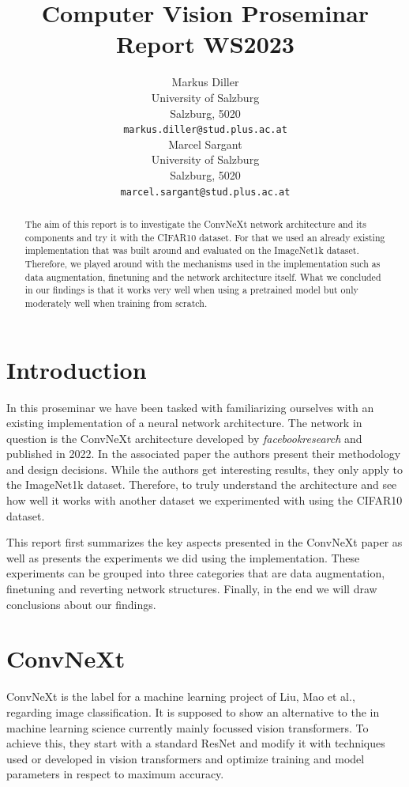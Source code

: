\documentclass{article}
\title{Computer Vision Proseminar Report WS2023}
\author{%
    Markus Diller\\
    University of Salzburg\\
    Salzburg, 5020 \\
    \texttt{markus.diller@stud.plus.ac.at} \\
    \And
    Marcel Sargant \\
    University of Salzburg \\
    Salzburg, 5020 \\
    \texttt{marcel.sargant@stud.plus.ac.at} \\
}
\begin{document}
\maketitle


\begin{abstract}
    The aim of this report is to investigate the ConvNeXt network architecture and its components and try it with the CIFAR10 dataset.
    For that we used an already existing implementation that was built around and evaluated on the ImageNet1k dataset.
    Therefore, we played around with the mechanisms used in the implementation such as data augmentation, finetuning and the network architecture itself.
    What we concluded in our findings is that it works very well when using a pretrained model but only moderately well when training from scratch.
\end{abstract}


\section{Introduction}\label{sec:introduction}
In this proseminar we have been tasked with familiarizing ourselves with an existing implementation of a neural network architecture.
The network in question is the ConvNeXt architecture developed by \textit{facebookresearch} and published in 2022.
In the associated paper the authors present their methodology and design decisions.
While the authors get interesting results, they only apply to the ImageNet1k dataset.
Therefore, to truly understand the architecture and see how well it works with another dataset we experimented with using the CIFAR10 dataset.

This report first summarizes the key aspects presented in the ConvNeXt paper as well as presents the experiments we did using the implementation.
These experiments can be grouped into three categories that are data augmentation, finetuning and reverting network structures.
Finally, in the end we will draw conclusions about our findings.

\section{ConvNeXt}\label{sec:convnext}
ConvNeXt\cite{liu2022convnet} is the label for a machine learning project of Liu, Mao et al., regarding image classification.
It is supposed to show an alternative to the in machine learning science currently mainly focussed vision transformers.
To achieve this, they start with a standard ResNet and modify it with techniques used or developed in vision transformers and optimize training and model parameters in respect to maximum accuracy.
\end{document}
